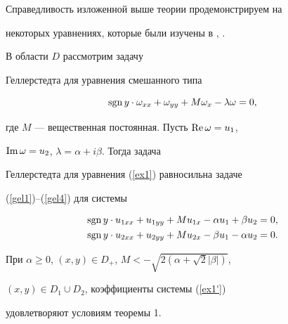 Справедливость изложенной выше теории продемонстрируем на


некоторых уравнениях, которые были изучены в \cite{Mois}, \cite{Pon}.





\begin{exam}


В области $D$ рассмотрим задачу


Геллерстедта для уравнения смешанного типа


\begin{equation}\label{ex1}


\sgn y\cdot\omega_{xx} +


\omega_{yy}+M\omega_x-\lambda\omega=0,


\end{equation}


где $M$ --- вещественная постоянная. Пусть $\operatorname{Re}\omega=u_1$,


$\operatorname{Im}\omega=u_2$, $\lambda=\alpha+i\beta$. Тогда задача


Геллерстедта для уравнения (\ref{ex1}) равносильна задаче


(\ref{gel1})--(\ref{gel4}) для системы


\begin{equation}\label{ex1'}


\begin{split}


\sgn y\cdot u_{1xx}+u_{1yy}+Mu_{1x}-\alpha


u_1+\beta u_2&=0,\\


\sgn y\cdot u_{2xx}+u_{2yy}+Mu_{2x}-\beta


u_1-\alpha u_2&=0.


\end{split}


\end{equation}


При $\alpha\ge0$, $(x,y)\in D_+$, $M<-\sqrt{2(\alpha+\sqrt{2}|\beta|)}$,


$(x,y)\in D_1\cup D_2$, коэффициенты системы (\ref{ex1'})


удовлетворяют условиям теоремы 1.


\end{exam}





